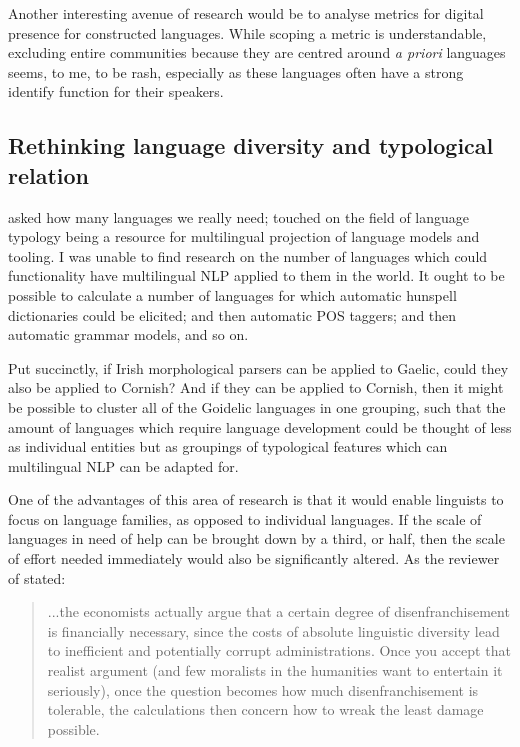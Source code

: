 Another interesting avenue of research would be to analyse metrics for digital presence for constructed languages. While scoping a metric is understandable, excluding entire communities because they are centred around \textit{a priori} languages seems, to me, to be rash, especially as these languages often have a strong identify function for their speakers.

\subsection{Rethinking language diversity and typological relation}

\citet{ginsburgh2011many} asked how many languages we really need; \citet{bender2010grand, bender2016linguistic} touched on the field of language typology being a resource for multilingual projection of language models and tooling. I was unable to find research on the number of languages which could functionality have multilingual NLP applied to them in the world. It ought to be possible to calculate a number of languages for which automatic hunspell dictionaries could be elicited; and then automatic POS taggers; and then automatic grammar models, and so on.

Put succinctly, if Irish morphological parsers can be applied to Gaelic, could they also be applied to Cornish? And if they can be applied to Cornish, then it might be possible to cluster all of the Goidelic languages in one grouping, such that the amount of languages which require language development could be thought of less as individual entities but as groupings of typological features which can multilingual NLP can be adapted for.

One of the advantages of this area of research is that it would enable linguists to focus on language families, as opposed to individual languages. If the scale of languages in need of help can be brought down by a third, or half, then the scale of effort needed immediately would also be significantly altered. As the reviewer of \citet{ginsburgh2011many} stated:

\begin{quote}
...the economists actually argue that a certain degree of disenfranchisement is financially necessary, since the costs of absolute linguistic diversity lead to inefficient and potentially corrupt administrations. Once you accept that realist argument (and few moralists in the humanities want to entertain it seriously), once the question becomes how much disenfranchisement is tolerable, the calculations then concern how to wreak the least damage possible. \citep[672--673]{pym2013how}
\end{quote}


